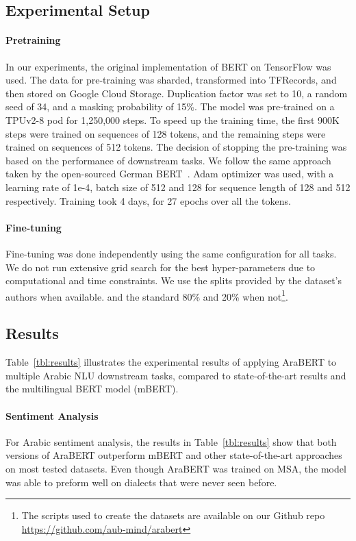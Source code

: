 \documentclass[10pt, a4paper]{article}
\begin{document}
\subsection{Experimental Setup}
\paragraph{Pretraining}
In our experiments, the original implementation of BERT on TensorFlow was used.  The data for pre-training was sharded, transformed into TFRecords, and then stored on Google Cloud Storage.  Duplication factor was set to 10, a random seed of 34, and a masking probability of 15\%. The model was pre-trained on a TPUv2-8 pod for 1,250,000 steps.  To speed up the training time, the first 900K steps were trained on sequences of 128 tokens, and the remaining steps were trained on sequences of 512 tokens. The decision of stopping the pre-training was based on the performance of downstream tasks. We follow the same approach taken by the open-sourced German BERT~\cite{deepset}. Adam optimizer was used, with a learning rate of 1e-4, batch size of 512 and 128 for sequence length of 128 and 512 respectively. Training took 4 days, for 27 epochs over all the tokens.

\paragraph{Fine-tuning}
Fine-tuning was done independently using the same configuration for all tasks. We do not run extensive grid search for the best hyper-parameters due to computational and time constraints. We use the splits provided by the dataset's authors when available. and the standard 80\% and 20\% when not\footnote{The scripts used to create the datasets are available on our Github repo \url{https://github.com/aub-mind/arabert}}.

\renewcommand{\tabularxcolumn}[1]{m{#1}}

\subsection{Results}

Table~\ref{tbl:results} illustrates the experimental results of applying AraBERT to multiple Arabic NLU downstream tasks, compared to state-of-the-art results and the multilingual BERT model (mBERT).

\paragraph{Sentiment Analysis}
For Arabic sentiment analysis, the results in Table~\ref{tbl:results} show that both versions of AraBERT outperform mBERT and other state-of-the-art approaches on most tested datasets.  Even though AraBERT was trained on MSA, the model was able to preform well on dialects that were never seen before. 
\end{document}
